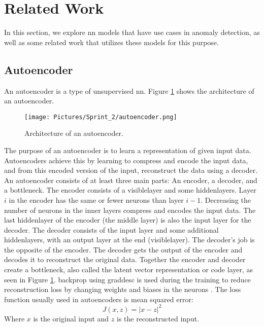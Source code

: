 \section{Related Work}\label{sec:related_work}
In this section, we explore \gls{nn} models that have use cases in anomaly detection, as well as some related work that utilizes these models for this purpose.

\subsection{Autoencoder}
An autoencoder is a type of unsupervised \gls{nn}. Figure \ref{fig:autoencoder} shows the architecture of an autoencoder.


\begin{figure}[htbp]
    \centering
    \texttt{[image: Pictures/Sprint\_2/autoencoder.png]}
    \caption{Architecture of an autoencoder.}
    \label{fig:autoencoder}
\end{figure}

\noindent
The purpose of an autoencoder is to learn a representation of given input data. Autoencoders achieve this by learning to compress and encode the input data, and from this encoded version of the input, reconstruct the data using a decoder. An autoencoder consists of at least three main parts: An encoder, a decoder, and a bottleneck. The encoder consists of a \gls{visiblelayer} and some \glspl{hiddenlayer}. Layer $i$ in the encoder has the same or fewer neurons than layer $i-1$. Decreasing the number of neurons in the inner layers compress and encodes the input data. The last \gls{hiddenlayer} of the encoder (the middle layer) is also the input layer for the decoder. The decoder consists of the input layer and some additional \glspl{hiddenlayer}, with an output layer at the end (\gls{visiblelayer}). The decoder's job is the opposite of the encoder. The decoder gets the output of the encoder and decodes it to reconstruct the original data. Together the encoder and decoder create a bottleneck, also called the latent vector representation or code layer, as seen in Figure \ref{fig:autoencoder}. \Gls{backprop} using \gls{graddesc} is used during the training to reduce reconstruction loss by changing weights and biases in the neurons \cite{autoencoder_used}\cite{autoencoder_into}. The loss function usually used in autoencoders is mean squared error:\newline
\begin{equation}
    J(x, z)=\lvert x - z \rvert^2
\end{equation}
Where $x$ is the original input and $z$ is the reconstructed input.

